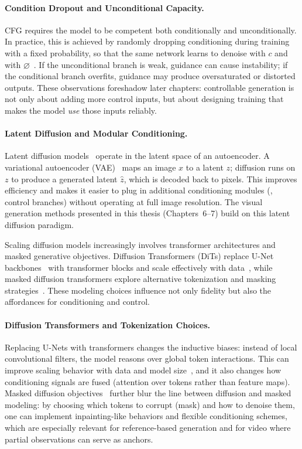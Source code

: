 \paragraph{Condition Dropout and Unconditional Capacity.}
CFG requires the model to be competent both conditionally and unconditionally. In practice, this is achieved by randomly dropping conditioning during training with a fixed probability, so that the same network learns to denoise with $c$ and with $\varnothing$~\citep{ho2022classifier}. If the unconditional branch is weak, guidance can cause instability; if the conditional branch overfits, guidance may produce oversaturated or distorted outputs. These observations foreshadow later chapters: controllable generation is not only about adding more control inputs, but about designing training that makes the model \emph{use} those inputs reliably.

\paragraph{Latent Diffusion and Modular Conditioning.}
Latent diffusion models~\citep{rombach2022high} operate in the latent space of an autoencoder. A variational autoencoder (VAE)~\citep{kingma2013auto} maps an image $x$ to a latent $z$; diffusion runs on $z$ to produce a generated latent $\hat z$, which is decoded back to pixels. This improves efficiency and makes it easier to plug in additional conditioning modules (\eg, control branches) without operating at full image resolution. The visual generation methods presented in this thesis (Chapters~6--7) build on this latent diffusion paradigm.

Scaling diffusion models increasingly involves transformer architectures and masked generative objectives. Diffusion Transformers (DiTs) replace U-Net backbones~\citep{ronneberger2015u} with transformer blocks and scale effectively with data~\citep{peebles2023scalable}, while masked diffusion transformers explore alternative tokenization and masking strategies~\citep{gao2023masked}. These modeling choices influence not only fidelity but also the affordances for conditioning and control.

\paragraph{Diffusion Transformers and Tokenization Choices.}
Replacing U-Nets with transformers changes the inductive biases: instead of local convolutional filters, the model reasons over global token interactions. This can improve scaling behavior with data and model size~\citep{peebles2023scalable}, and it also changes how conditioning signals are fused (attention over tokens rather than feature maps). Masked diffusion objectives~\citep{gao2023masked} further blur the line between diffusion and masked modeling: by choosing which tokens to corrupt (mask) and how to denoise them, one can implement inpainting-like behaviors and flexible conditioning schemes, which are especially relevant for reference-based generation and for video where partial observations can serve as anchors.

